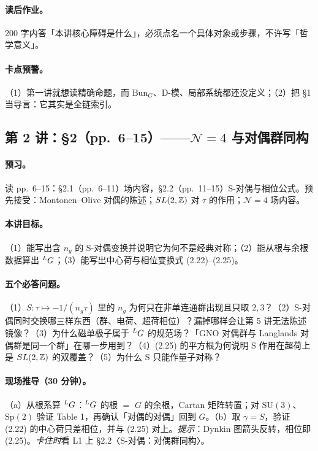 {\paragraph{读后作业。}200 字内答「本讲核心障碍是什么」，必须点名一个具体对象或步骤，不许写「哲学意义」。\pC

\paragraph{卡点预警。}（1）第一讲就想读精确命题，而 \(\mathrm{Bun}_G\)、D-模、局部系统都还没定义；（2）把 §1 当导言：它其实是全链索引。\pC

\subsection{第 2 讲：\S2（pp.~6--15）——\texorpdfstring{\(\mathcal N=4\)}{N=4} 与对偶群同构}

\paragraph{预习。}读 pp.~6--15：§2.1（pp.~6--11）场内容，§2.2（pp.~11--15）S-对偶与相位公式。预先接受：Montonen--Olive 对偶的陈述；\(SL(2,\mathbb{Z})\) 对 \(\tau\) 的作用；\(\mathcal N=4\) 场内容。\pC

\paragraph{本讲目标。}（1）能写出含 \(n_g\) 的 S-对偶变换并说明它为何不是经典对称；（2）能从根与余根数据算出 \({}^{L}G\)；（3）能写出中心荷与相位变换式 (2.22)--(2.25)。\pC

\paragraph{五个必答问题。}（1）\(S:\tau\mapsto-1/(n_g\tau)\) 里的 \(n_g\) 为何只在非单连通群出现且只取 \(2,3\)？（2）S-对偶同时交换哪三样东西（群、电荷、超荷相位）？漏掉哪样会让第 5 讲无法陈述镜像？（3）为什么磁单极子属于 \({}^{L}G\) 的规范场？「GNO 对偶群与 Langlands 对偶群是同一个群」在哪一步用到？（4）(2.25) 的平方根为何说明 S 作用在超荷上是 \(SL(2,\mathbb{Z})\) 的双覆盖？（5）为什么 S 只能作量子对称？\pC

\paragraph{现场推导（30 分钟）。}（a）从根系算 \({}^{L}G\)：\({}^{L}G\) 的根 \(=\) \(G\) 的余根，Cartan 矩阵转置；对 \(\mathrm{SU}(3)\)、\(\mathrm{Sp}(2)\) 验证 Table 1，再确认「对偶的对偶」回到 \(G\)。（b）取 \(\gamma=S\)，验证 (2.22) 的中心荷只差相位，并与 (2.25) 对上。\emph{提示}：Dynkin 图箭头反转，相位即 (2.25)。\emph{卡住时}看 L1 上 §2.2〈S-对偶：对偶群同构〉。\pC

}
